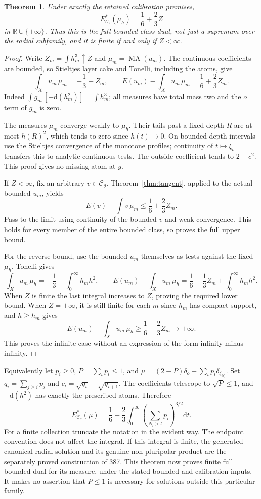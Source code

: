 \documentclass[11pt]{article}
\newtheorem{theorem}{Theorem}
\newcommand{\MA}{\operatorname{MA}}
\newcommand{\R}{\mathbb R}
\begin{document}
\begin{theorem}\label{thm:dual}
Under exactly the retained calibration premises,
\[
 E^*_{\mathcal C_\theta}(\mu_h)=\frac16+\frac23Z
\]
in $\R\cup\{+\infty\}$. Thus this is the full bounded-class dual,
not just a supremum over the radial subfamily, and it is finite if and
only if $Z<\infty$.
\end{theorem}
\begin{proof}
Write $Z_m=\int h_m^3\uparrow Z$ and $\mu_m=\MA(u_m)$.
The continuous coefficients are bounded, so Stieltjes layer cake and
Tonelli, including the atoms, give
\[
 \int_Xu_m\,\mu_m=-\frac13-Z_m,
 \qquad E(u_m)-\int_Xu_m\,\mu_m=\frac16+\frac23Z_m.
\]
Indeed $\int g_m\,[-\mathrm d(h_m^2)]=\int h_m^3$; all measures
have total mass two and the $o$ term of $g_m$ is zero.

The measures $\mu_m$ converge weakly to $\mu_h$. Their tails past
a fixed depth $R$ are at most $h(R)^2$, which tends to zero since
$h(t)\to0$. On bounded depth intervals use the Stieltjes convergence
of the monotone profiles; continuity of $t\mapsto\xi_t$ transfers
this to analytic continuous tests. The outside coefficient tends to
$2-c^2$. This proof gives no missing atom at $y$.

If $Z<\infty$, fix an arbitrary $v\in\mathcal C_\theta$.
Theorem~\ref{thm:tangent}, applied to the actual bounded $u_m$, yields
\[
 E(v)-\int v\,\mu_m\leq\frac16+\frac23Z_m.
\]
Pass to the limit using continuity of the bounded $v$ and weak
convergence. This holds for every member of the entire bounded class,
so proves the full upper bound.

For the reverse bound, use the bounded $u_m$ themselves as tests
against the fixed $\mu_h$. Tonelli gives
\[
 \int_Xu_m\,\mu_h=-\frac13-\int_0^\infty h_mh^2,
 \qquad
 E(u_m)-\int_Xu_m\,\mu_h
     =\frac16-\frac13Z_m+\int_0^\infty h_mh^2.
\]
When $Z$ is finite the last integral increases to $Z$, proving
the required lower bound. When $Z=+\infty$, it is still finite for
each $m$ since $h_m$ has compact support, and $h\geq h_m$ gives
\[
 E(u_m)-\int_Xu_m\,\mu_h\geq\frac16+\frac23Z_m\longrightarrow+\infty.
\]
This proves the infinite case without an expression of the form
infinity minus infinity.
\end{proof}

Equivalently let $p_i\geq0$, $P=\sum_i p_i\leq1$, and
$\mu=(2-P)\delta_o+\sum_i p_i\delta_{\xi_{N_i}}$.
Set $q_i=\sum_{j\geq i}p_j$ and
$c_i=\sqrt{q_i}-\sqrt{q_{i+1}}$. The coefficients telescope to
$\sqrt P\leq1$, and $-\mathrm d(h^2)$ has exactly the prescribed
atoms. Therefore
\[
 E^*_{\mathcal C_\theta}(\mu)
   =\frac16+\frac23\int_0^\infty
          \left(\sum_{N_i>t}p_i\right)^{3/2}\mathrm dt.
\]
For a finite collection truncate the notation in the evident way.
The endpoint convention does not affect the integral. If this integral
is finite, the generated canonical radial solution and its genuine
non-pluripolar product are the separately proved construction of 387.
This theorem now proves finite full bounded dual for its measure,
under the stated bounded and calibration inputs. It makes no assertion
that $P\leq1$ is necessary for solutions outside this particular family.
\end{document}
